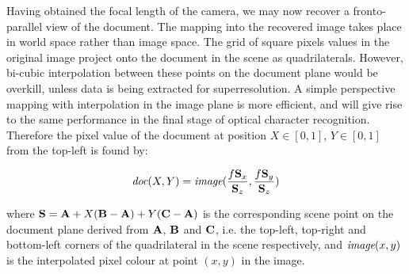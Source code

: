 Having obtained the focal length of the camera, we may now recover a fronto-parallel view of the document.  The mapping into the recovered image takes place in world space rather than image space.
The grid of square pixels values in the original image project onto the document in the scene as quadrilaterals.
However, bi-cubic interpolation between these points on the document plane would be overkill,
unless data is being extracted for superresolution.
A simple perspective mapping with interpolation in the image plane is more efficient, and
will give rise to the same performance in the final stage of optical character recognition.
Therefore the pixel value of the document at position $X \in [0,1]$, $Y \in [0,1]$ from the top-left is found by:

\begin{equation}
\mbox{\em doc}(X,Y) = \mbox{\em image}(\frac{f{ \bf S }_x}{{ \bf S }_z},\frac{f{ \bf S }_y}{{ \bf S }_z})
\end{equation}


where
${ \bf S } = { \bf A } + X ( { \bf B }-{ \bf A } ) + Y ( { \bf C }-{ \bf A } )$
is the corresponding scene point on the document plane
derived from ${ \bf A }$, ${ \bf B }$ and ${ \bf C }$, i.e. the top-left, top-right and bottom-left corners of the
quadrilateral in the scene 
respectively, and $\mbox{\em image}(x,y)$ is the interpolated pixel colour at point $(x,y)$ in the image.

